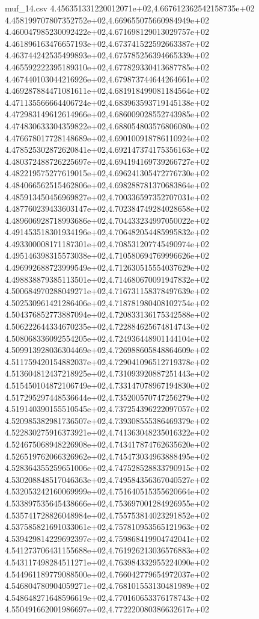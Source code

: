 \begin{filecontents*}{muf_14.csv}
4.456351331220012071e+02,4.667612362542158735e+02
4.458199707807352752e+02,4.669655075660984949e+02
4.460047985230092422e+02,4.671698129013029757e+02
4.461896163476657193e+02,4.673741522592663387e+02
4.463744242535499893e+02,4.675785256394665339e+02
4.465592222395189310e+02,4.677829330413687785e+02
4.467440103044216926e+02,4.679873744644264661e+02
4.469287884471081611e+02,4.681918499081184564e+02
4.471135566664406724e+02,4.683963593719145138e+02
4.472983149612614966e+02,4.686009028552743985e+02
4.474830633304359822e+02,4.688054803576806080e+02
4.476678017728148689e+02,4.690100918786110924e+02
4.478525302872620841e+02,4.692147374175356163e+02
4.480372488726225697e+02,4.694194169739266727e+02
4.482219575277619015e+02,4.696241305472776730e+02
4.484066562515462806e+02,4.698288781370683864e+02
4.485913450456969827e+02,4.700336597352707031e+02
4.487760239433603147e+02,4.702384749284028658e+02
4.489606928718993686e+02,4.704433234997050022e+02
4.491453518301934196e+02,4.706482054485995832e+02
4.493300008171187301e+02,4.708531207745490974e+02
4.495146398315573038e+02,4.710580694769996626e+02
4.496992688723999549e+02,4.712630515554037629e+02
4.498838879385113501e+02,4.714680670091947832e+02
4.500684970288049271e+02,4.716731158378497639e+02
4.502530961421286406e+02,4.718781980408102754e+02
4.504376852773887094e+02,4.720833136175342588e+02
4.506222644334670235e+02,4.722884625674814743e+02
4.508068336092554205e+02,4.724936448901144104e+02
4.509913928036304469e+02,4.726988605848864609e+02
4.511759420154882037e+02,4.729041096512719378e+02
4.513604812437218925e+02,4.731093920887251443e+02
4.515450104872106749e+02,4.733147078967194830e+02
4.517295297448536644e+02,4.735200570747256279e+02
4.519140390155510545e+02,4.737254396222097057e+02
4.520985382981736507e+02,4.739308555386469379e+02
4.522830275916373921e+02,4.741363048235016322e+02
4.524675068948226908e+02,4.743417874762635620e+02
4.526519762066326962e+02,4.745473034963888495e+02
4.528364355259651006e+02,4.747528528833790915e+02
4.530208848517046363e+02,4.749584356367040527e+02
4.532053242160069999e+02,4.751640515355620664e+02
4.533897535645438666e+02,4.753697001284926955e+02
4.535741728826048984e+02,4.755753814023291852e+02
4.537585821691033061e+02,4.757810953565121963e+02
4.539429814229692397e+02,4.759868419904742041e+02
4.541273706431155688e+02,4.761926213036576883e+02
4.543117498284511271e+02,4.763984332955224090e+02
4.544961189779088500e+02,4.766042779654972037e+02
4.546804780904059271e+02,4.768101553130481989e+02
4.548648271648596619e+02,4.770160653376178743e+02
4.550491662001986697e+02,4.772220080386632617e+02

\end{filecontents*}
